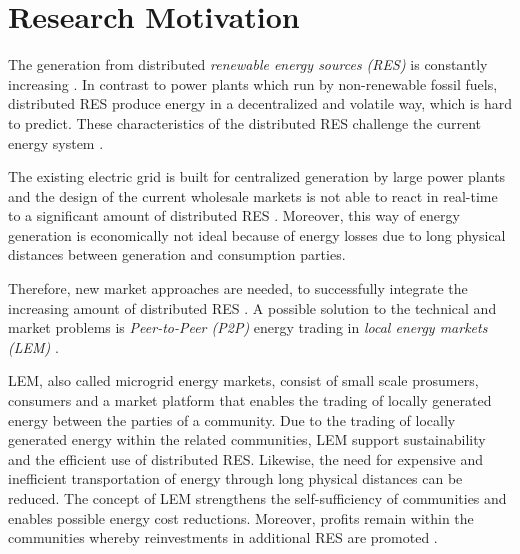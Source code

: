 \section{Research Motivation}
\label{sec:research_motivation}

The generation from distributed \textit{renewable energy sources (RES)} is constantly increasing . 
In contrast to power plants which run by non-renewable fossil fuels, distributed RES produce energy in a decentralized and volatile way, which is hard to predict. 
These characteristics of the distributed RES challenge the current energy system .

The existing electric grid is built for centralized generation by large power plants 
and the design of the current wholesale markets
is not able to react in real-time to a significant amount of distributed RES  . 
Moreover, this way of energy generation is economically not ideal because of energy losses due to long physical
distances between generation and consumption parties. 

Therefore, new market approaches are needed, to successfully integrate the increasing amount of distributed RES . 
A possible solution to the technical and market problems is \textit{Peer-to-Peer (P2P)} energy trading in \textit{local energy markets (LEM)} . 

LEM, also called microgrid energy markets, consist of small scale prosumers, consumers and a market platform that enables the trading 
of locally generated energy between the parties of a community.
Due to the trading of locally generated energy within the related communities,
LEM support sustainability and the efficient use of distributed RES.
Likewise, the need for expensive and inefficient transportation of energy through long physical 
distances can be reduced. The concept of LEM strengthens the self-sufficiency of communities and 
enables possible energy cost reductions. Moreover, profits remain within the communities 
whereby reinvestments in additional RES are promoted . 

